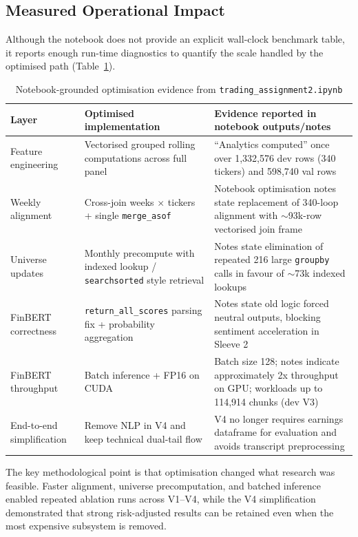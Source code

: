 \documentclass[11pt,twoside,a4paper]{article}
\begin{document}
\subsection*{Measured Operational Impact}
Although the notebook does not provide an explicit wall-clock benchmark table, it reports enough run-time diagnostics to quantify the scale handled by the optimised path (Table~\ref{tab:efficiency}).

\begin{table}[h]
\centering
\caption{Notebook-grounded optimisation evidence from \texttt{trading\_assignment2.ipynb}}
\label{tab:efficiency}
\begin{tabularx}{\textwidth}{@{}>{\raggedright\arraybackslash}p{2.5cm}X>{\raggedright\arraybackslash}p{4.9cm}@{}}
\toprule
Layer & Optimised implementation & Evidence reported in notebook outputs/notes \\
\midrule
Feature engineering & Vectorised grouped rolling computations across full panel & ``Analytics computed'' once over 1,332,576 dev rows (340 tickers) and 598,740 val rows \\
Weekly alignment & Cross-join weeks \(\times\) tickers + single \verb|merge_asof| & Notebook optimisation notes state replacement of 340-loop alignment with \(\sim\)93k-row vectorised join frame \\
Universe updates & Monthly precompute with indexed lookup / \verb|searchsorted| style retrieval & Notes state elimination of repeated 216 large \verb|groupby| calls in favour of \(\sim\)73k indexed lookups \\
FinBERT correctness & \verb|return_all_scores| parsing fix + probability aggregation & Notes state old logic forced neutral outputs, blocking sentiment acceleration in Sleeve 2 \\
FinBERT throughput & Batch inference + FP16 on CUDA & Batch size 128; notes indicate approximately 2x throughput on GPU; workloads up to 114,914 chunks (dev V3) \\
End-to-end simplification & Remove NLP in V4 and keep technical dual-tail flow & V4 no longer requires earnings dataframe for evaluation and avoids transcript preprocessing \\
\bottomrule
\end{tabularx}
\end{table}

The key methodological point is that optimisation changed what research was feasible. Faster alignment, universe precomputation, and batched inference enabled repeated ablation runs across V1--V4, while the V4 simplification demonstrated that strong risk-adjusted results can be retained even when the most expensive subsystem is removed.
\end{document}
